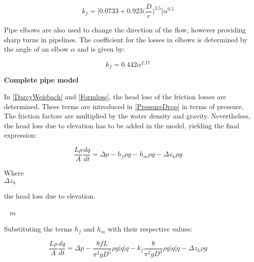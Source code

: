 \begin{equation}
  k_f = \bigg[0.0733 + 0.923 \bigg(\frac{D}{r}\bigg)^{3.5}\bigg]\alpha^{0.5}
  \label{kfriction}
\end{equation}

Pipe elbows are also used to change the direction of the flow, however providing 
sharp turns in pipelines. The coefficient for the losses in elbows is determined by the angle of an elbow $\alpha$ and is given by:

\begin{equation}
  k_f = 0.442\alpha^{2.17}
\end{equation}

\textbf{Complete pipe model}
\label{CompletePipe}    %

In \eqref{DarcyWeisbach} and \eqref{Formloss}, the head loss of the friction losses are determined. These terms are introduced in \eqref{PressureDrop} in terms of pressure. The friction factors are multiplied by the water density and gravity. Nevertheless, the head loss due to elevation has to be added in the model, yielding the final expression:

\begin{equation}
   \frac{L \rho}{A} \frac{dq}{dt} =\Delta p - h_f \rho g - h_m \rho g - \Delta z_h \rho g
\end{equation}
 \begin{minipage}[t]{0.20\textwidth}
Where\\
\hspace*{8mm} $\Delta z_h$ \\
\end{minipage}
\begin{minipage}[t]{0.68\textwidth}
\vspace*{2mm}
the head loss due to elevation.
\end{minipage}
\begin{minipage}[t]{0.10\textwidth}
\vspace*{2mm}
\textcolor{White}{te}$\unit{m}$
\end{minipage}

Substituting the terms $h_f$ and $h_m$ with their respective values:

\begin{equation}
\label{FinalPipeModel}
   \frac{L \rho}{A} \frac{dq}{dt} =\Delta p - \frac{8fL}{\pi^{2}gD^5} \rho g  |q| q - k_f \frac{8}{\pi^2gD^4} \rho g |q| q - \Delta z_h \rho g 
\end{equation}

